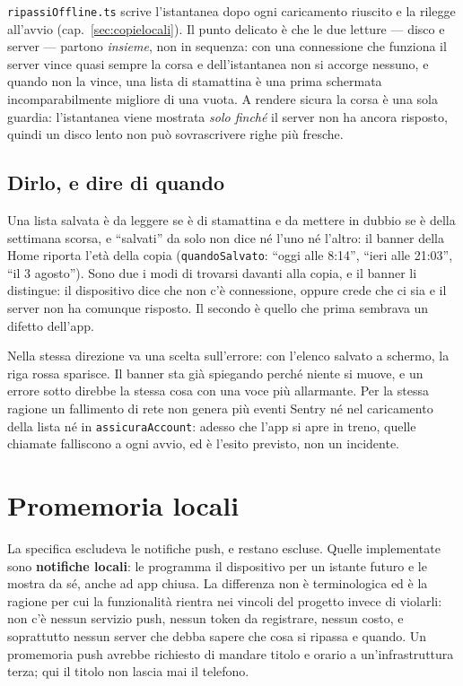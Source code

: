 \documentclass[11pt,a4paper]{report}
\begin{document}
\texttt{ripassiOffline.ts} scrive l'istantanea dopo ogni caricamento riuscito e
la rilegge all'avvio (cap.~\ref{sec:copielocali}). Il punto delicato \`e che le
due letture --- disco e server --- partono \emph{insieme}, non in sequenza: con
una connessione che funziona il server vince quasi sempre la corsa e
dell'istantanea non si accorge nessuno, e quando non la vince, una lista di
stamattina \`e una prima schermata incomparabilmente migliore di una vuota. A
rendere sicura la corsa \`e una sola guardia: l'istantanea viene mostrata
\emph{solo finch\'e} il server non ha ancora risposto, quindi un disco lento non
pu\`o sovrascrivere righe pi\`u fresche.

\section{Dirlo, e dire di quando}

Una lista salvata \`e da leggere se \`e di stamattina e da mettere in dubbio se
\`e della settimana scorsa, e ``salvati'' da solo non dice n\'e l'uno n\'e
l'altro: il banner della Home riporta l'et\`a della copia
(\texttt{quandoSalvato}: ``oggi alle 8:14'', ``ieri alle 21:03'', ``il 3
agosto''). Sono due i modi di trovarsi davanti alla copia, e il banner li
distingue: il dispositivo dice che non c'\`e connessione, oppure crede che ci
sia e il server non ha comunque risposto. Il secondo \`e quello che prima
sembrava un difetto dell'app.

Nella stessa direzione va una scelta sull'errore: con l'elenco salvato a
schermo, la riga rossa sparisce. Il banner sta gi\`a spiegando perch\'e niente
si muove, e un errore sotto direbbe la stessa cosa con una voce pi\`u
allarmante. Per la stessa ragione un fallimento di rete non genera pi\`u eventi
Sentry n\'e nel caricamento della lista n\'e in \texttt{assicuraAccount}: adesso
che l'app si apre in treno, quelle chiamate falliscono a ogni avvio, ed \`e
l'esito previsto, non un incidente.

\chapter{Promemoria locali}
\label{sec:notifiche}

La specifica escludeva le notifiche push, e restano escluse. Quelle
implementate sono \textbf{notifiche locali}: le programma il dispositivo per
un istante futuro e le mostra da s\'e, anche ad app chiusa. La differenza non
\`e terminologica ed \`e la ragione per cui la funzionalit\`a rientra nei
vincoli del progetto invece di violarli: non c'\`e nessun servizio push,
nessun token da registrare, nessun costo, e soprattutto nessun server che
debba sapere che cosa si ripassa e quando. Un promemoria push avrebbe
richiesto di mandare titolo e orario a un'infrastruttura terza; qui il titolo
non lascia mai il telefono.
\end{document}
